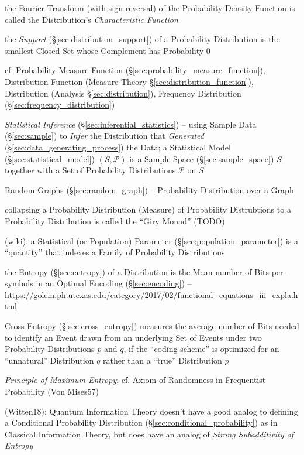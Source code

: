 the Fourier Transform (with sign reversal) of the Probability Density Function
is called the Distribution's \emph{Characteristic Function}

the \emph{Support} (\S\ref{sec:distribution_support}) of a Probability
Distribution is the smallest Closed Set whose Complement has Probability $0$

\fist cf. Probability Measure Function
(\S\ref{sec:probability_measure_function}), Distribution Function (Measure
Theory \S\ref{sec:distribution_function}), Distribution (Analysis
\S\ref{sec:distribution}), Frequency Distribution
(\S\ref{sec:frequency_distribution})

\fist \emph{Statistical Inference} (\S\ref{sec:inferential_statistics}) -- using
Sample Data (\S\ref{sec:sample}) to \emph{Infer} the Distribution that
\emph{Generated} (\S\ref{sec:data_generating_process}) the Data; a Statistical
Model (\S\ref{sec:statistical_model}) $(S,\mathcal{P})$ is a Sample Space
(\S\ref{sec:sample_space}) $S$ together with a Set of Probability Distributions
$\mathcal{P}$ on $S$

\fist Random Graphs (\S\ref{sec:random_graph}) -- Probability Distribution over
a Graph

collapsing a Probability Distribution (Measure) of Probability Distrubtions to a
Probability Distribution is called the ``Giry Monad'' (TODO)

(wiki): a Statistical (or Population) Parameter
(\S\ref{sec:population_parameter}) is a ``quantity'' that indexes a Family of
Probability Distributions

the Entropy (\S\ref{sec:entropy}) of a Distribution is the Mean number
of Bits-per-symbols in an Optimal Encoding (\S\ref{sec:encoding}) --
\url{https://golem.ph.utexas.edu/category/2017/02/functional_equations_iii_expla.html}

Cross Entropy (\S\ref{sec:cross_entropy}) measures the average number of Bits
needed to identify an Event drawn from an underlying Set of Events under two
Probability Distributions $p$ and $q$, if the ``coding scheme'' is optimized for
an ``unnatural'' Distribution $q$ rather than a ``true'' Distribution $p$

\emph{Principle of Maximum Entropy}; cf. Axiom of Randomness in Frequentist
Probability (Von Mises57)

(Witten18): Quantum Information Theory doesn't have a good analog to defining a
Conditional Probability Distribution (\S\ref{sec:conditional_probability}) as in
Classical Information Theory, but does have an analog of \emph{Strong
  Subadditivity of Entropy}

